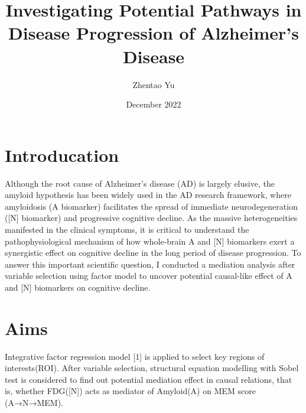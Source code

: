 \documentclass{article}
\title{Investigating Potential Pathways in Disease Progression of Alzheimer's Disease}
\author{Zhentao Yu}
\date{December 2022}
\begin{document}
\maketitle

\section{Introducation}
Although the root cause of Alzheimer's disease (AD) is largely elusive, the amyloid hypothesis has been widely used in the AD research framework, where amyloidosis  (A biomarker) facilitates the spread of immediate neurodegeneration ([N] biomarker) and progressive cognitive decline. As the massive heterogeneities manifested in the clinical symptoms, it is critical to understand the pathophysiological mechanism of how whole-brain A and [N] biomarkers exert a synergistic effect on cognitive decline in the long period of disease progression. To answer this important scientific question, I conducted a mediation analysis after variable selection using factor model to uncover potential causal-like effect of A and [N] biomarkers on cognitive decline. 
\section{Aims}
Integrative factor regression model [1] is applied to select key regions of interests(ROI). After variable selection, structural equation modelling with Sobel test is considered to find out potential mediation effect in causal relations, that is, whether FDG([N]) acts as mediator of Amyloid(A) on MEM score (A→N→MEM).
\end{document}

